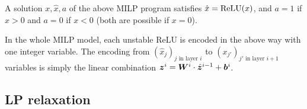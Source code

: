 \begin{proposition}
\cite{MILP}
\label{Prop1}
A solution $x,\hat{x},a$  of the above MILP program satisfies $\hat{x} = \mathrm{ReLU}(x)$,
and $a=1$ if $x> 0$ and $a=0$ if $x< 0$ (both are possible if $x=0$).
\end{proposition}

	
    \iffalse
	The global structure is as follows, using Gurobi as an example:
	\begin{enumerate}
		\item For each input node, each output node, and each pre-activation and post-activation node in the hidden layers,  set one variable. 
		\item Set constraints for input nodes.
		\item For each pre-activation node in a hidden layer (and each output node), set linear constraints relating them to the post-activation or input nodes in the previous layer they connect to.
		\item Between pre- and post- activation nodes, set the MILP constraint described above.
	\end{enumerate} 
    
    \fi
    
    In the whole MILP model, each unstable ReLU is encoded in the above way with one integer variable. The encoding from $(\hat{x}_j)_{j \text{ in layer } i}$ to 
	$(x_{j'})_{j' \text{ in layer } i+1}$ variables is simply the linear combination 
	$\boldsymbol{z}^{i} = \boldsymbol{W}^i\cdot \hat{\boldsymbol{z}}^{i-1}+ {\bm{b}}^i$.
    
    \subsection{LP relaxation}

